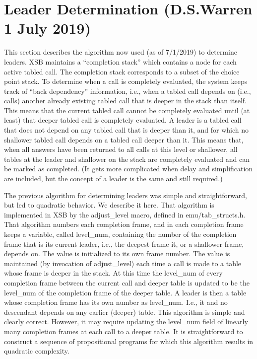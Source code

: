 \section{Leader Determination (D.S.Warren 1 July 2019)} \label{sec:leader}

This section describes the algorithm now used (as of 7/1/2019) to
determine leaders.  XSB maintains a ``completion stack'' which
contains a node for each active tabled call.  The completion stack
corresponds to a subset of the choice point stack.  To determine when
a call is completely evaluated, the system keeps track of ``back
dependency'' information, i.e., when a tabled call depends on (i.e.,
calls) another already existing tabled call that is deeper in the
stack than itself.  This means that the current tabled call cannot be
completely evaluated until (at least) that deeper tabled call is
completely evaluated.  A leader is a tabled call that does not depend
on any tabled call that is deeper than it, and for which no shallower
tabled call depends on a tabled call deeper than it.  This means that,
when all answers have been returned to all calls at this level or
shallower, all tables at the leader and shallower on the stack are
completely evaluated and can be marked as completed.  (It gets more
complicated when delay and simplification are included, but the
concept of a leader is the same and still required.)

The previous algorithm for determining leaders was simple and
straightforward, but led to quadratic behavior.  We describe it here.
That algorithm is implemented in XSB by the adjust\_level macro,
defined in emu/tab\_structs.h.  That algorithm numbers each completion
frame, and in each completion frame keeps a variable, called
level\_num, containing the number of the completion frame that is its
current leader, i.e., the deepest frame it, or a shallower frame,
depends on.  The value is initialized to its own frame number.  The
value is maintained (by invocation of adjust\_level) each time a call
is made to a table whose frame is deeper in the stack.  At this time
the level\_num of every completion frame between the current call and
deeper table is updated to be the level\_num of the completion frame
of the deeper table.  A leader is then a table whose completion frame
has its own number as level\_num.  I.e., it and no descendant depends
on any earlier (deeper) table.  This algorithm is simple and clearly
correct.  However, it may require updating the level\_num field of
linearly many completion frames at each call to a deeper table.  It is
straightforward to construct a sequence of propositional programs for
which this algorithm results in quadratic complexity.

